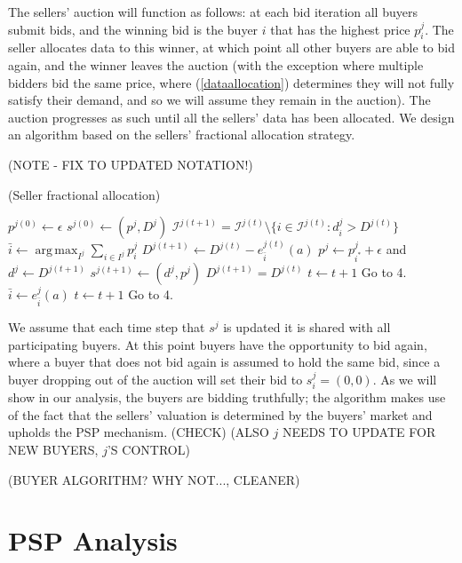 \documentclass[12pt]{article}
\theoremstyle{definition}
\newcommand{\mcI}{\mathcal{I}}
\DeclareMathOperator*{\argmax}{arg\,max}
\begin{document}
\begin{multicols}{2}
The sellers' auction will function as follows: at each bid iteration all buyers
submit bids, and the winning bid is the buyer $i$ that has the highest price
$p_i^j$. The seller allocates
data to this winner, at which point all other buyers are able to bid again, and
the winner leaves the auction (with the exception where multiple bidders bid
the same price, where (\ref{dataallocation}) determines they will not fully
satisfy their demand, and so we will assume they remain in the auction). The auction progresses as such until all the
sellers' data has been allocated. We design an algorithm based on the sellers'
fractional allocation strategy.

(NOTE - FIX TO UPDATED NOTATION!)
\begin{algorithm}[H]
\caption{(Seller fractional allocation)}
\begin{algorithmic}[1]
\State $p^{j(0)} \gets \epsilon$
\State $s^{j(0)} \gets (p^j, D^j)$
\State $\mcI^{j(t+1)} = \mcI^{j(t)}\setminus \lbrace i \in \mcI^{j(t)}: d_i^j >
D^{j(t)}\rbrace$
\State $ \bar{i} \gets \displaystyle\argmax_{I^j}\sum_{i\in I^j} p_i^j$ 
\State $D^{j(t+1)} \gets D^{j(t)} - e_{\bar{i}}^{j(t)}(a)$
\State $p^j \gets p_{i^*}^j+\epsilon$ and $d^j \gets D^{j(t+1)}$
\State $s^{j(t+1)} \gets (d^j, p^j)$
\State $D^{j(t+1)} = D^{j(t)}$
\State $t \gets t+1$
\State Go to 4.
\Else
\State $\bar{i} \gets e_{\bar{i}}^j(a)$
\State $t \gets t+1$
\State Go to 4.
\EndIf
\EndWhile
\end{algorithmic}
\end{algorithm}
We assume that each time step that $s^j$ is updated it is shared with all
participating buyers. At this point buyers have the opportunity to bid again,
where a buyer that does not bid again is assumed to hold the same bid, since a
buyer dropping out of the auction will set their bid to $s_i^j=(0,0)$. As we will show in our analysis, the buyers are bidding truthfully; the
algorithm makes use of the fact that the sellers' valuation is determined by
the buyers' market and upholds the PSP mechanism. (CHECK) (ALSO $j$ NEEDS TO
UPDATE FOR NEW BUYERS, $j$'S CONTROL)

(BUYER ALGORITHM? WHY NOT..., CLEANER)

\section{PSP Analysis}\label{analysis}

\end{multicols}
\end{document}
